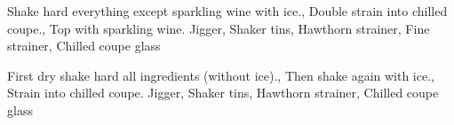 \documentclass[../main.tex]{subfiles}
\begin{document}
    \cocktailDivider

    {
            {Shake hard everything except sparkling wine with ice.},
            {Double strain into chilled coupe.},
            {Top with sparkling wine.}
    }
    {Jigger, Shaker tins, Hawthorn strainer, Fine strainer, Chilled coupe glass}

    \cocktailDivider

    {
            {First dry shake hard all ingredients (without ice).},
            {Then shake again with ice.},
            {Strain into chilled coupe.}
    }
    {Jigger, Shaker tins, Hawthorn strainer, Chilled coupe glass}

    \clearpage
\end{document}
